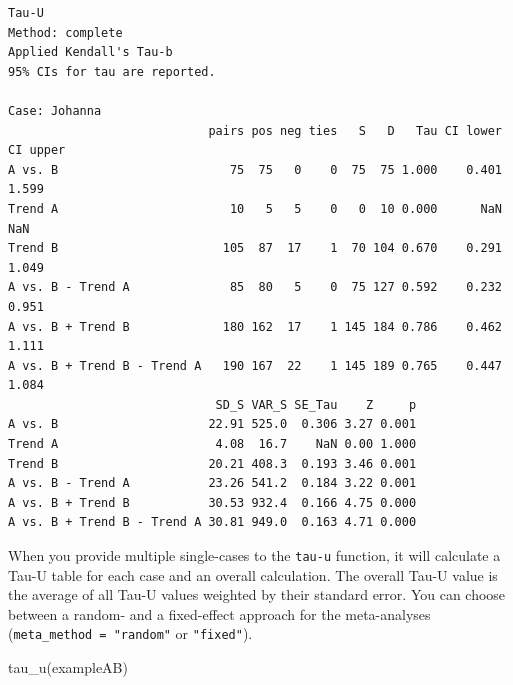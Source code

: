 \documentclass[
  letterpaper,
  DIV=11,
  numbers=noendperiod]{scrreprt}
\newenvironment{Shaded}{\begin{snugshade}}{\end{snugshade}}
\newcommand{\FunctionTok}[1]{\textcolor[rgb]{0.28,0.35,0.67}{#1}}
\newcommand{\NormalTok}[1]{\textcolor[rgb]{0.00,0.23,0.31}{#1}}
\begin{document}
\begin{verbatim}
Tau-U
Method: complete 
Applied Kendall's Tau-b
95% CIs for tau are reported.

Case: Johanna 
                            pairs pos neg ties   S   D   Tau CI lower CI upper
A vs. B                        75  75   0    0  75  75 1.000    0.401    1.599
Trend A                        10   5   5    0   0  10 0.000      NaN      NaN
Trend B                       105  87  17    1  70 104 0.670    0.291    1.049
A vs. B - Trend A              85  80   5    0  75 127 0.592    0.232    0.951
A vs. B + Trend B             180 162  17    1 145 184 0.786    0.462    1.111
A vs. B + Trend B - Trend A   190 167  22    1 145 189 0.765    0.447    1.084
                             SD_S VAR_S SE_Tau    Z     p
A vs. B                     22.91 525.0  0.306 3.27 0.001
Trend A                      4.08  16.7    NaN 0.00 1.000
Trend B                     20.21 408.3  0.193 3.46 0.001
A vs. B - Trend A           23.26 541.2  0.184 3.22 0.001
A vs. B + Trend B           30.53 932.4  0.166 4.75 0.000
A vs. B + Trend B - Trend A 30.81 949.0  0.163 4.71 0.000
\end{verbatim}

When you provide multiple single-cases to the \texttt{tau-u} function,
it will calculate a Tau-U table for each case and an overall
calculation. The overall Tau-U value is the average of all Tau-U values
weighted by their standard error. You can choose between a random- and a
fixed-effect approach for the meta-analyses
(\texttt{meta\_method\ =\ "random"} or \texttt{"fixed"}).

\begin{Shaded}
\begin{Highlighting}[]
\FunctionTok{tau\_u}\NormalTok{(exampleAB)}
\end{Highlighting}
\end{Shaded}
\end{document}
